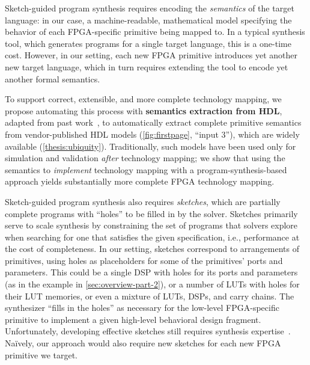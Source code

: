 Sketch-guided program synthesis requires
  encoding the \textit{semantics}
  of the target language:
  in our case,
  a machine-readable,
  mathematical model specifying
  the behavior of each
  FPGA-specific primitive
  being mapped to.
In a typical synthesis tool,
  which generates programs
  for a single target language,
  this is a one-time cost.
However,
  in our setting,
  each new FPGA primitive
  introduces yet another new target language,
  which in turn requires
  extending the tool to encode
  yet another formal semantics.

To support
  correct, extensible, and more complete
  technology mapping, we propose
  automating this process with
  \textbf{semantics extraction from HDL}, 
  adapted from past work~\cite{daly2022synthesizing},
  to automatically extract
  complete primitive semantics
  from vendor-published HDL models
  (\cref{fig:firstpage}, ``input 3''),
  which are widely available
  (\cref{thesis:ubiquity}).
Traditionally, such models have
   been used only 
  for
  simulation and validation
  \textit{after} technology mapping;
  we show that using the semantics
  to
  \textit{implement}
  technology mapping
  with a program-synthesis-based approach
  yields substantially more
  complete FPGA technology mapping.

Sketch-guided program synthesis also
  requires \textit{sketches}, which are 
  partially complete programs with ``holes'' to be filled in
  by the solver.
Sketches primarily serve to
  scale synthesis by
  constraining the set of programs that 
  solvers explore when searching for
  one that satisfies
  the given specification,
  i.e., performance at the cost of completeness.
In our setting,
  sketches correspond to
  arrangements of primitives,
  using holes
  as placeholders
  for some of the primitives' 
  ports and parameters.
This could be
  a single DSP with holes for
  its ports and parameters
  (as in the example in \cref{sec:overview-part-2}),
  or a number of LUTs with holes for their LUT memories,
  or even a mixture of LUTs, DSPs, and carry chains.
The synthesizer ``fills in the holes''
  as necessary for
  the low-level FPGA-specific primitive to implement
  a given high-level behavioral design fragment.
Unfortunately,
  developing effective sketches
  still requires synthesis expertise~\cite{10.1145/3140587.3062353,vanGeffenJITSynth}.
  Na\"ively, our approach would also
  require new sketches for each new
  FPGA primitive we target.


